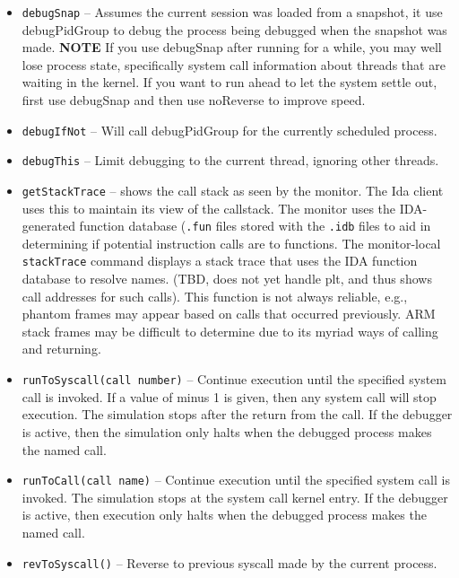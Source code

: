 \documentclass[titlepage]{article}
\begin{document}
\begin{itemize}
\item {\tt debugSnap} -- Assumes the current session was loaded from a snapshot, it use debugPidGroup to debug the process being debugged when the snapshot was made.
\textbf{NOTE} If you use debugSnap after running for a while, you may well lose process state, specifically system call information about 
threads that are waiting in the kernel.  If you want to run ahead to let the system settle out, first use debugSnap and then use noReverse to improve speed.

\item {\tt debugIfNot} -- Will call debugPidGroup for the currently scheduled process.

\item {\tt debugThis} -- Limit debugging to the current thread, ignoring other threads.

\item {\tt getStackTrace} – shows the call stack as seen by the monitor.  The Ida client uses this to maintain its view of the callstack.  The monitor
uses the IDA-generated function database ({\tt .fun} files stored with the {\tt .idb} files to aid in determining if 
potential instruction calls are to functions.  The monitor-local {\tt stackTrace} command displays a
stack trace that uses the IDA function database to resolve names.  (TBD, does not yet handle plt, and thus shows call addresses for such calls).
This function is not always reliable, e.g., phantom frames may appear based on calls that occurred previously. ARM stack frames may be
difficult to determine due to its myriad ways of calling and returning. 

\item {\tt runToSyscall(call number)} – Continue execution until the specified system call is invoked.  If a value of minus 1 is given, then any system call will stop execution.  The simulation stops after the return from the call.  If the debugger is active, then the simulation only halts when the debugged process makes the named call.

\item {\tt runToCall(call name)} – Continue execution until the specified system call is invoked.  The simulation stops at the system call kernel entry.
If the debugger is active, then execution only halts when the debugged process makes the named call.

\item {\tt revToSyscall()} -- Reverse to previous syscall made by the current process.


\end{itemize}
\end{document}
